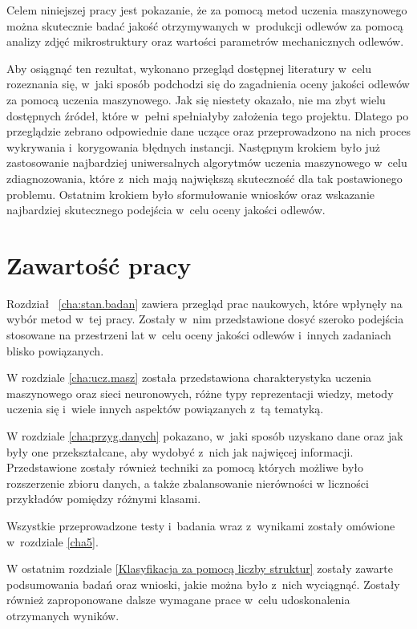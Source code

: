 Celem niniejszej pracy jest pokazanie, że za pomocą metod uczenia maszynowego można skutecznie badać jakość otrzymywanych w~produkcji odlewów za pomocą analizy zdjęć mikrostruktury oraz wartości parametrów mechanicznych odlewów. 

Aby osiągnąć ten rezultat, wykonano przegląd dostępnej literatury w~celu rozeznania się, w~jaki sposób podchodzi się do zagadnienia oceny jakości odlewów za pomocą uczenia maszynowego. Jak się niestety okazało, nie ma zbyt wielu dostępnych źródeł, które w~pełni spełniałyby założenia tego projektu. Dlatego po przeglądzie zebrano odpowiednie dane uczące oraz przeprowadzono na nich proces wykrywania i~korygowania błędnych instancji. Następnym krokiem było już zastosowanie najbardziej uniwersalnych algorytmów uczenia maszynowego w~celu zdiagnozowania, które z~nich mają największą skuteczność dla tak postawionego problemu. Ostatnim krokiem było sformułowanie wniosków oraz wskazanie najbardziej skutecznego podejścia w~celu oceny jakości odlewów.



\section{Zawartość pracy}
\label{sec:zawartosc}

Rozdział ~\ref{cha:stan.badan} zawiera przegląd prac naukowych, które wpłynęły na wybór metod w~tej pracy. Zostały w~nim przedstawione dosyć szeroko podejścia stosowane na przestrzeni lat w~celu oceny jakości odlewów i~innych zadaniach blisko powiązanych. 

W rozdziale \ref{cha:ucz.masz} została przedstawiona charakterystyka uczenia maszynowego oraz sieci neuronowych, różne typy reprezentacji wiedzy, metody uczenia się i~wiele innych aspektów powiązanych z~tą tematyką. 

W rozdziale \ref{cha:przyg.danych} pokazano, w~jaki sposób uzyskano dane oraz jak były one przekształcane, aby wydobyć z~nich jak najwięcej informacji. Przedstawione zostały również techniki za pomocą których możliwe było rozszerzenie zbioru danych, a także zbalansowanie nierówności w liczności przykładów pomiędzy różnymi klasami.

Wszystkie przeprowadzone testy i~badania wraz z~wynikami zostały omówione w~rozdziale \ref{cha5}. 

W ostatnim rozdziale \ref{Klasyfikacja za pomocą liczby struktur} zostały zawarte podsumowania badań oraz wnioski, jakie można było z~nich wyciągnąć. Zostały również zaproponowane dalsze wymagane prace w~celu udoskonalenia otrzymanych wyników.













